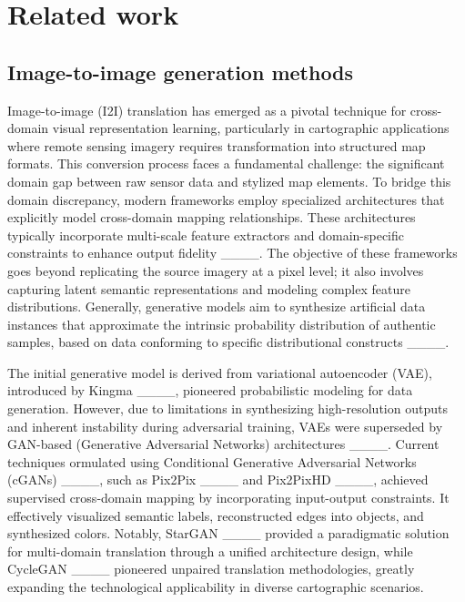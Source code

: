 \section{Related work}
\subsection{Image-to-image generation methods}
Image-to-image (I2I) translation has emerged as a pivotal technique for cross-domain visual representation learning, particularly in cartographic applications where remote sensing imagery requires transformation into structured map formats. This conversion process faces a fundamental challenge: the significant domain gap between raw sensor data and stylized map elements. To bridge this domain discrepancy, modern frameworks employ specialized architectures that explicitly model cross-domain mapping relationships. These architectures typically incorporate multi-scale feature extractors and domain-specific constraints to enhance output fidelity ____. The objective of these frameworks goes beyond replicating the source imagery at a pixel level; it also involves capturing latent semantic representations and modeling complex feature distributions. Generally, generative models aim to synthesize artificial data instances that approximate the intrinsic probability distribution of authentic samples, based on data conforming to specific distributional constructs ____.

The initial generative model is derived from variational autoencoder (VAE), introduced by Kingma ____, pioneered probabilistic modeling for data generation. However, due to limitations in synthesizing high-resolution outputs and inherent instability during adversarial training, VAEs were superseded by GAN-based (Generative Adversarial Networks) architectures ____. Current techniques ormulated using Conditional Generative Adversarial Networks (cGANs) ____, such as Pix2Pix ____ and Pix2PixHD ____,  achieved supervised cross-domain mapping by incorporating input-output constraints. It effectively visualized semantic labels, reconstructed edges into objects, and synthesized colors. Notably, StarGAN ____ provided a paradigmatic solution for multi-domain translation through a unified architecture design, while CycleGAN ____ pioneered unpaired translation methodologies, greatly expanding the technological applicability in diverse cartographic scenarios.


